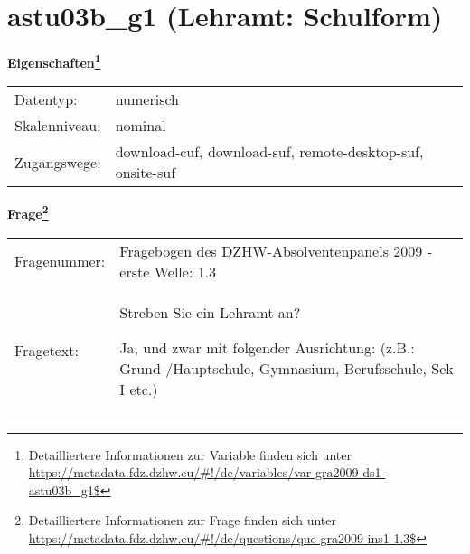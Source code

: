 
    \setcounter{footnote}{0}

    \vspace*{-1.8cm}
	\section{astu03b\_g1 (Lehramt: Schulform)}
	\label{section:astu03b_g1}



    \vspace*{0.5cm}
    \noindent\textbf{Eigenschaften\footnote{Detailliertere Informationen zur Variable finden sich unter
		\url{https://metadata.fdz.dzhw.eu/\#!/de/variables/var-gra2009-ds1-astu03b_g1$}}}\\
	\begin{tabularx}{\hsize}{@{}lX}
	Datentyp: & numerisch \\
	Skalenniveau: & nominal \\
	Zugangswege: &
	  download-cuf, 
	  download-suf, 
	  remote-desktop-suf, 
	  onsite-suf
 \\
    \end{tabularx}



				\vspace*{0.5cm}
                \noindent\textbf{Frage\footnote{Detailliertere Informationen zur Frage finden sich unter
		              \url{https://metadata.fdz.dzhw.eu/\#!/de/questions/que-gra2009-ins1-1.3$}}}\\
				\begin{tabularx}{\hsize}{@{}lX}
					Fragenummer: &
					  Fragebogen des DZHW-Absolventenpanels 2009 - erste Welle:
					  1.3
 \\
					Fragetext: & Streben Sie ein Lehramt an?\par  Ja, und zwar mit folgender Ausrichtung: (z.B.: Grund-/Hauptschule, Gymnasium, Berufsschule, Sek I etc.) \\
				\end{tabularx}





